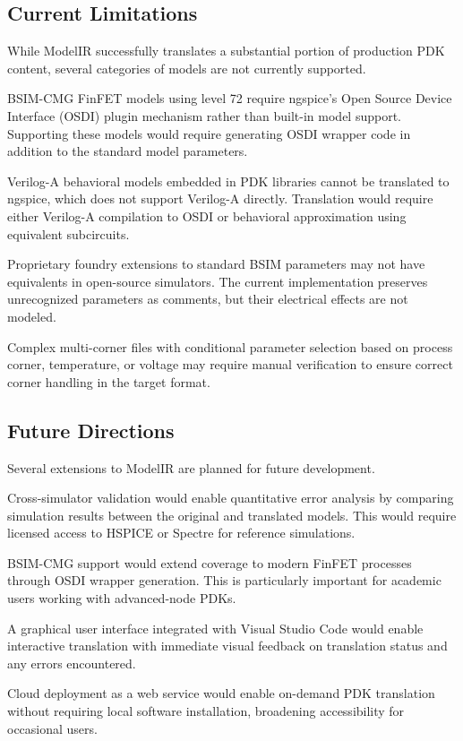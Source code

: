 \documentclass[conference]{IEEEtran}
\begin{document}
\subsection{Current Limitations}

While ModelIR successfully translates a substantial portion of production PDK content, several categories of models are not currently supported.

BSIM-CMG FinFET models using level 72 require ngspice's Open Source Device Interface (OSDI) plugin mechanism rather than built-in model support. Supporting these models would require generating OSDI wrapper code in addition to the standard model parameters.

Verilog-A behavioral models embedded in PDK libraries cannot be translated to ngspice, which does not support Verilog-A directly. Translation would require either Verilog-A compilation to OSDI or behavioral approximation using equivalent subcircuits.

Proprietary foundry extensions to standard BSIM parameters may not have equivalents in open-source simulators. The current implementation preserves unrecognized parameters as comments, but their electrical effects are not modeled.

Complex multi-corner files with conditional parameter selection based on process corner, temperature, or voltage may require manual verification to ensure correct corner handling in the target format.

\subsection{Future Directions}

Several extensions to ModelIR are planned for future development.

Cross-simulator validation would enable quantitative error analysis by comparing simulation results between the original and translated models. This would require licensed access to HSPICE or Spectre for reference simulations.

BSIM-CMG support would extend coverage to modern FinFET processes through OSDI wrapper generation. This is particularly important for academic users working with advanced-node PDKs.

A graphical user interface integrated with Visual Studio Code would enable interactive translation with immediate visual feedback on translation status and any errors encountered.

Cloud deployment as a web service would enable on-demand PDK translation without requiring local software installation, broadening accessibility for occasional users.
\end{document}
